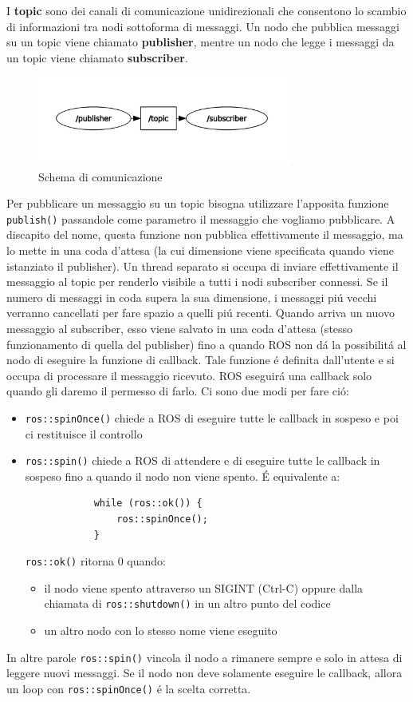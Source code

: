 I \textbf{topic} sono dei canali di comunicazione unidirezionali che consentono lo scambio di informazioni tra nodi sottoforma di 
messaggi. Un nodo che pubblica messaggi su un topic viene chiamato \textbf{publisher}, mentre un nodo che legge i messaggi da un topic 
viene chiamato \textbf{subscriber}.
\begin{figure}[H]
    \centering
    \includegraphics*[width=0.75\textwidth]{images/topic_graph.png}
    \caption{Schema di comunicazione}
    \label{fig:topic_graph}
\end{figure}
Per pubblicare un messaggio su un topic bisogna utilizzare l'apposita funzione \verb|publish()| passandole come parametro 
il messaggio che vogliamo pubblicare.
A discapito del nome, questa funzione non pubblica effettivamente il messaggio, ma lo mette in una coda d'attesa (la cui 
dimensione viene specificata quando viene istanziato il publisher).
Un thread separato si occupa di inviare effettivamente il messaggio al topic per renderlo visibile a tutti i nodi subscriber 
connessi.
Se il numero di messaggi in coda supera la sua dimensione, i messaggi pi\'{u} vecchi verranno cancellati per fare spazio 
a quelli pi\'{u} recenti. Quando arriva un nuovo messaggio al subscriber, esso viene salvato 
in una coda d'attesa (stesso funzionamento di quella del publisher) fino a quando ROS non d\'{a} la possibilit\'{a} al nodo 
di eseguire la funzione di callback. Tale funzione \'{e} definita dall'utente e si occupa di processare il messaggio ricevuto. 
ROS eseguir\'{a} una callback solo quando gli daremo il permesso di farlo. Ci sono due modi per fare ci\'{o}:
\begin{itemize}
    \item \verb|ros::spinOnce()| chiede a ROS di eseguire tutte le callback in sospeso e poi ci restituisce il controllo
    \item \verb|ros::spin()| chiede a ROS di attendere e di eseguire tutte le callback in sospeso fino a quando il nodo non 
          viene spento. \'{E} equivalente a:
          \begin{verbatim}
            while (ros::ok()) {
                ros::spinOnce();
            }
          \end{verbatim} 
          \verb|ros::ok()| ritorna 0 quando: 
          \begin{itemize}
            \item il nodo viene spento attraverso un SIGINT (Ctrl-C) oppure dalla chiamata di \verb|ros::shutdown()| in 
                  un altro punto del codice
            \item un altro nodo con lo stesso nome viene eseguito
          \end{itemize}
\end{itemize}
In altre parole \verb|ros::spin()| vincola il nodo a rimanere sempre e solo in attesa di leggere nuovi messaggi. 
Se il nodo non deve solamente eseguire le callback, allora un loop con \verb|ros::spinOnce()| \'{e} la scelta corretta. 
